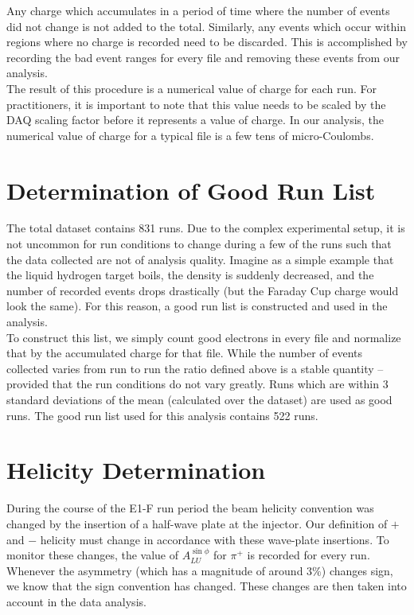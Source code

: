 Any charge which accumulates in a period of time where the number of events did not change is not added to the total.  Similarly, any events which occur within regions where no charge is recorded need to be discarded.  This is accomplished by recording the bad event ranges for every file and removing these events from our analysis. \\

The result of this procedure is a numerical value of charge for each run.  For practitioners, it is important to note that this value needs to be scaled by the DAQ scaling factor before it represents a value of charge.  In our analysis, the numerical value of charge for a typical file is a few tens of micro-Coulombs.

\section{Determination of Good Run List}
The total dataset contains 831 runs.  Due to the complex experimental setup, it is not uncommon for run conditions to change during a few of the runs such that the data collected are not of analysis quality.  Imagine as a simple example that the liquid hydrogen target boils, the density is suddenly decreased, and the number of recorded events drops drastically (but the Faraday Cup charge would look the same).  For this reason, a good run list is constructed and used in the analysis. \\

To construct this list, we simply count good electrons in every file and normalize that by the accumulated charge for that file.  While the number of events collected varies from run to run the ratio defined above is a stable quantity -- provided that the run conditions do not vary greatly.  Runs which are within 3 standard deviations of the mean (calculated over the dataset) are used as good runs.  The good run list used for this analysis contains 522 runs.  


\section{Helicity Determination}
During the course of the E1-F run period the beam helicity convention was changed by the insertion of a half-wave plate at the injector.  Our definition of $+$ and $-$ helicity must change in accordance with these wave-plate insertions.  To monitor these changes, the value of $A_{LU}^{\sin\phi}$ for $\pi^+$ is recorded for every run.  Whenever the asymmetry (which has a magnitude of around $3\%$) changes sign, we know that the sign convention has changed.  These changes are then taken into account in the data analysis.   

